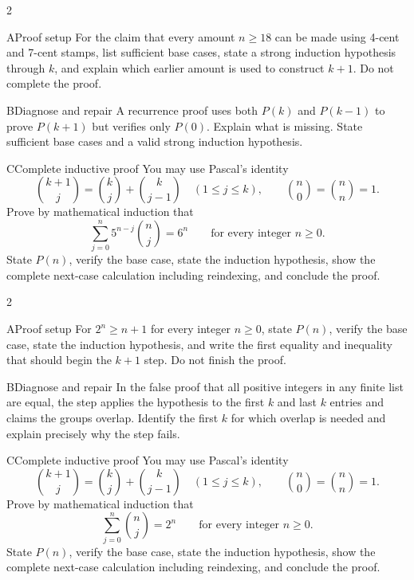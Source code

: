 \documentclass[9pt]{extarticle}
\begin{document}
\CoreWorkArea
\FormBreak
{}
\begin{multicols}{2}
\begin{CompactCoreProblem}{A}{Proof setup}
For the claim that every amount $n\ge18$ can be made using 4-cent and 7-cent stamps, list sufficient base cases, state a strong induction hypothesis through $k$, and explain which earlier amount is used to construct $k+1$. Do not complete the proof.
\end{CompactCoreProblem}
\begin{CompactCoreProblem}{B}{Diagnose and repair}
A recurrence proof uses both $P(k)$ and $P(k-1)$ to prove $P(k+1)$ but verifies only $P(0)$. Explain what is missing. State sufficient base cases and a valid strong induction hypothesis.
\end{CompactCoreProblem}
\end{multicols}
\begin{CompactCoreProblem}{C}{Complete inductive proof}
You may use Pascal's identity
\[
\binom{k+1}{j}=\binom{k}{j}+\binom{k}{j-1}
\quad(1\le j\le k),\qquad
\binom{n}{0}=\binom{n}{n}=1.
\]
Prove by mathematical induction that
\[
\sum_{j=0}^{n} 5^{n-j}\binom{n}{j}=6^n\qquad\text{for every integer }n\ge0.
\]
State $P(n)$, verify the base case, state the induction hypothesis, show the complete next-case calculation including reindexing, and conclude the proof.
\end{CompactCoreProblem}
\CoreWorkArea
\FormBreak
{}
\begin{multicols}{2}
\begin{CompactCoreProblem}{A}{Proof setup}
For $2^n\ge n+1$ for every integer $n\ge0$, state $P(n)$, verify the base case, state the induction hypothesis, and write the first equality and inequality that should begin the $k+1$ step. Do not finish the proof.
\end{CompactCoreProblem}
\begin{CompactCoreProblem}{B}{Diagnose and repair}
In the false proof that all positive integers in any finite list are equal, the step applies the hypothesis to the first $k$ and last $k$ entries and claims the groups overlap. Identify the first $k$ for which overlap is needed and explain precisely why the step fails.
\end{CompactCoreProblem}
\end{multicols}
\begin{CompactCoreProblem}{C}{Complete inductive proof}
You may use Pascal's identity
\[
\binom{k+1}{j}=\binom{k}{j}+\binom{k}{j-1}
\quad(1\le j\le k),\qquad
\binom{n}{0}=\binom{n}{n}=1.
\]
Prove by mathematical induction that
\[
\sum_{j=0}^{n}\binom{n}{j}=2^n\qquad\text{for every integer }n\ge0.
\]
State $P(n)$, verify the base case, state the induction hypothesis, show the complete next-case calculation including reindexing, and conclude the proof.
\end{CompactCoreProblem}
\CoreWorkArea
\end{document}
